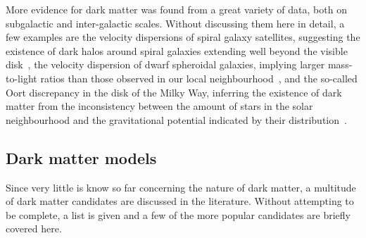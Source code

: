 More evidence for dark matter was found from a great variety of data, both on subgalactic and inter-galactic scales. Without discussing them here in detail, a few examples are the velocity dispersions of spiral galaxy satellites, suggesting the existence of dark halos around spiral galaxies extending well beyond the visible disk~\cite{Azzaro:2003hp}, the velocity dispersion of dwarf spheroidal galaxies, implying larger mass-to-light ratios than those observed in our local neighbourhood~\cite{Mateo:1998wg}, and the so-called Oort discrepancy in the disk of the Milky Way, inferring the existence of dark matter from the inconsistency between the amount of stars in the solar neighbourhood and the gravitational potential indicated by their distribution~\cite{Bahcall:1991qs}.

\subsection{Dark matter models}

Since very little is know so far concerning the nature of dark matter, a multitude of dark matter candidates are discussed in the literature. Without attempting to be complete, a list is given and a few of the more popular candidates are briefly covered here.

